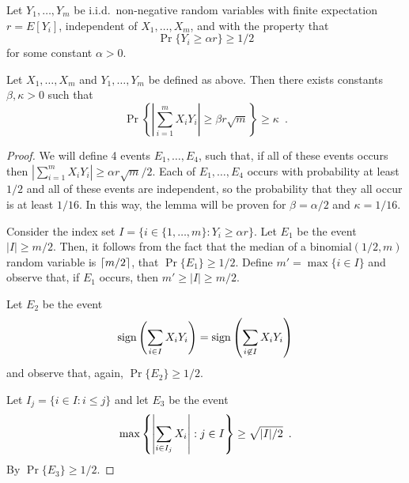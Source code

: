 \documentclass[lotsofwhite]{patmorin}
\DeclareMathOperator{\sign}{sign}
\begin{document}
Let $Y_1,\ldots,Y_m$ be i.i.d.\
non-negative random variables with finite expectation $r=E[Y_i]$,
independent of $X_1,\ldots,X_m$, and with the
property that 
\[ \Pr\{Y_i \ge \alpha r\} \ge 1/2 \]
for some constant
$\alpha > 0$.

\begin{lem}
Let $X_1,\ldots,X_m$ and $Y_1,\ldots,Y_m$ be defined as above.  Then
there exists constants $\beta,\kappa>0$ such that
\[
  \Pr\left\{\left|\sum_{i=1}^m X_iY_i\right| \ge \beta r\sqrt{m}\right\} 
     \ge \kappa \enspace .
\]
\end{lem}

\begin{proof}
We will define 4 events $E_1,\ldots,E_4$, such that, if all of these
events occurs then $\left|\sum_{i=1}^m X_iY_i\right| \ge \alpha
r\sqrt{m}/2$.  Each of $E_1,\ldots,E_4$ occurs with probability at
least $1/2$ and all of these events are independent, so the
probability that they all occur is at least $1/16$.  In this way, the 
lemma will be proven for $\beta = \alpha/2$ and $\kappa=1/16$.

Consider the index set $I=\{i\in\{1,\ldots,m\}: Y_i \ge \alpha r\}$.
Let $E_1$ be the event $|I| \ge m/2$.  Then, it follows from the fact
that the median of a $\textrm{binomial}(1/2,m)$ random variable is
$\left\lceil m/2 \right\rceil$, that $\Pr\{E_1\} \ge 1/2$.  Define $m' = \max\{i\in I\}$ and
observe that, if $E_1$ occurs, then $m'\ge |I| \ge m/2$.

Let $E_2$ be the event
\begin{equation}
	\sign\left(\sum_{i\in I} X_iY_i\right) = 
	\sign\left(\sum_{i\not\in I} X_iY_i\right) \eqlabel{sign}
\end{equation}
and observe that, again, $\Pr\{E_2\} \ge 1/2$.

Let $I_j=\{i\in I: i\le j\}$ and let $E_3$ be the event
\begin{equation}
	\max\left\{\left|\sum_{i\in I_j} X_i\right|:j\in I\right\} \ge
\sqrt{|I|/2} \enspace .
        \eqlabel{big}
\end{equation}
By  $\Pr\{E_3\}\ge 1/2$.


\end{proof}
\end{document}
